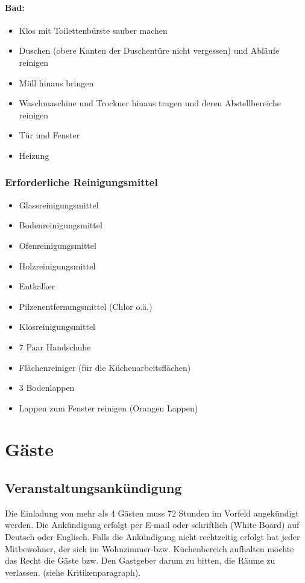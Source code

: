 \documentclass[10pt,a4paper,final]{article}
\begin{document}
\paragraph{Bad:} 
\begin{itemize}
\item Klos mit Toilettenbürste sauber machen
\item Duschen (obere Kanten der Duschentüre nicht vergessen) und Abläufe reinigen
\item Müll hinaus bringen
\item Waschmaschine und Trockner hinaus tragen und deren Abstellbereiche reinigen
\item Tür und Fenster
\item Heizung
\end{itemize}
\subsubsection{Erforderliche Reinigungsmittel}
\begin{itemize}
\item Glassreinigungsmittel
\item Bodenreinigungsmittel
\item Ofenreinigungsmittel
\item Holzreinigungsmittel
\item Entkalker
\item Pilzenentfernungsmittel (Chlor o.ä.)
\item Klosreinigungsmittel
\item 7 Paar Handschuhe
\item Flächenreiniger (für die Küchenarbeitsflächen)
\item 3 Bodenlappen
\item Lappen zum Fenster reinigen (Orangen Lappen)
\end{itemize}

\section{Gäste}
\subsection{Veranstaltungsankündigung} Die Einladung von mehr als 4 Gästen muss 72 Stunden im Vorfeld angekündigt werden. Die Ankündigung erfolgt per E-mail oder schriftlich (White Board) auf Deutsch oder Englisch. Falls die Ankündigung nicht rechtzeitig erfolgt hat jeder Mitbewohner, der sich im Wohnzimmer-bzw. Küchenbereich aufhalten möchte das Recht die Gäste bzw. Den Gastgeber darum zu bitten, die Räume zu verlassen. (siehe Kritikenparagraph).
\end{document}

